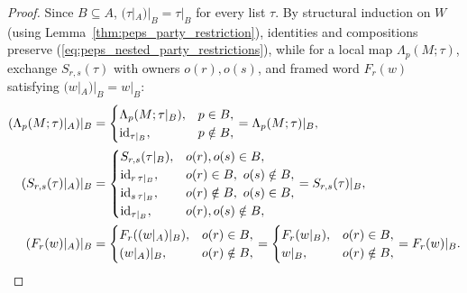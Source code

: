 \begin{proof}\leanok
    Since $B\subseteq A$, $(\tau|_A)|_B=\tau|_B$ for every list $\tau$.
    By structural induction on $W$ (using Lemma~\ref{thm:peps_party_restriction}), identities and compositions preserve (\ref{eq:peps_nested_party_restrictions}), while for a local map $\Lambda_p(M;\tau)$, exchange $S_{r,s}(\tau)$ with owners $o(r),o(s)$, and framed word $F_r(w)$ satisfying $(w|_A)|_B=w|_B$:
    \begin{align}
        (\Lambda_p(M;\tau)|_A)|_B
         & =\begin{cases}
                \Lambda_p(M;\tau|_B),        & p\in B,    \\
                \operatorname{id}_{\tau|_B}, & p\notin B,
            \end{cases}
        =\Lambda_p(M;\tau)|_B, \notag                                   \\
        (S_{r,s}(\tau)|_A)|_B
         & =\begin{cases}
                S_{r,s}(\tau|_B),               & o(r),o(s)\in B,           \\
                \operatorname{id}_{r\,\tau|_B}, & o(r)\in B,\ o(s)\notin B, \\
                \operatorname{id}_{s\,\tau|_B}, & o(r)\notin B,\ o(s)\in B, \\
                \operatorname{id}_{\tau|_B},    & o(r),o(s)\notin B,
            \end{cases}
        =S_{r,s}(\tau)|_B, \notag                                       \\
        (F_r(w)|_A)|_B
         & =\begin{cases}
                F_r((w|_A)|_B), & o(r)\in B,    \\
                (w|_A)|_B,      & o(r)\notin B,
            \end{cases}
        =\begin{cases}
             F_r(w|_B), & o(r)\in B,    \\
             w|_B,      & o(r)\notin B,
         \end{cases}
        =F_r(w)|_B. \notag
    \end{align}
\end{proof}


